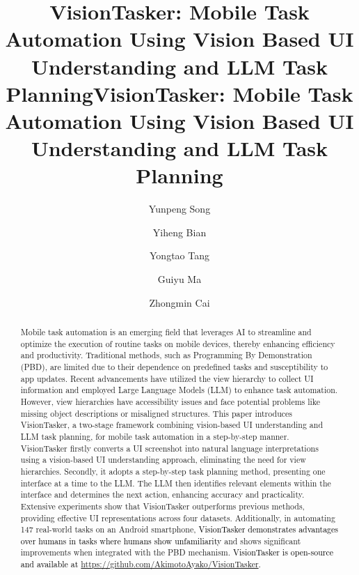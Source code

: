 \title{VisionTasker: Mobile Task Automation Using Vision Based UI Understanding and LLM Task Planning}



\title{VisionTasker: Mobile Task Automation Using Vision Based UI Understanding and LLM Task Planning}

\author{Yunpeng Song}

\author{Yiheng Bian}

\author{Yongtao Tang}

\author{Guiyu Ma}

\author{Zhongmin Cai}

\renewcommand{\shortauthors}{Song et al.}

\begin{abstract}
Mobile task automation is an emerging field that leverages AI to streamline and optimize the execution of routine tasks on mobile devices, thereby enhancing efficiency and productivity. Traditional methods, such as Programming By Demonstration (PBD), are limited due to their dependence on predefined tasks and susceptibility to app updates. Recent advancements have utilized the view hierarchy to collect UI information and employed Large Language Models (LLM) to enhance task automation. However, view hierarchies have accessibility issues and face potential problems like missing object descriptions or misaligned structures. This paper introduces VisionTasker, a two-stage framework combining vision-based UI understanding and LLM task planning, for mobile task automation in a step-by-step manner. VisionTasker firstly converts a UI screenshot into natural language interpretations using a vision-based UI understanding approach, eliminating the need for view hierarchies. Secondly, it adopts a step-by-step task planning method, presenting one interface at a time to the LLM. The LLM then identifies relevant elements within the interface and determines the next action, enhancing accuracy and practicality. Extensive experiments show that VisionTasker outperforms previous methods, providing effective UI representations across four datasets. Additionally, in automating 147 real-world tasks on an Android smartphone, \textcolor{black}{VisionTasker demonstrates advantages over humans in tasks where humans show unfamiliarity} and shows significant improvements when integrated with the PBD mechanism. \textcolor{black}{VisionTasker is open-source and available at \url{https://github.com/AkimotoAyako/VisionTasker}.}
\end{abstract}


